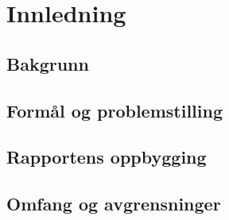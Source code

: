 \chapter{Innledning}
    
\section{Bakgrunn}
   


\section{Formål og problemstilling}




\section{Rapportens oppbygging}





\section{Omfang og avgrensninger}



